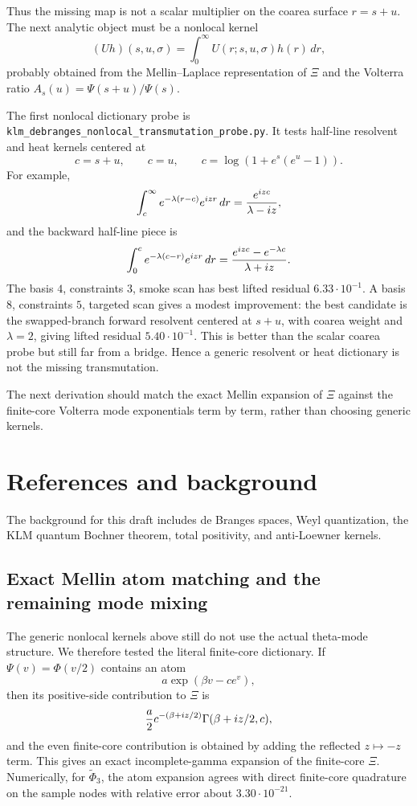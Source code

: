 \documentclass[11pt]{article}
\begin{document}
Thus the missing map is not a scalar multiplier on the coarea surface
\(r=s+u\).  The next analytic object must be a nonlocal kernel
\[
  (Uh)(s,u,\sigma)
  =
  \int_0^\infty U(r;s,u,\sigma)h(r)\,dr,
\]
probably obtained from the Mellin--Laplace representation of \(\Xi\) and the
Volterra ratio \(A_s(u)=\Psi(s+u)/\Psi(s)\).

The first nonlocal dictionary probe is
\texttt{klm\_debranges\_nonlocal\_transmutation\_probe.py}.  It tests
half-line resolvent and heat kernels centered at
\[
  c=s+u,\qquad c=u,\qquad
  c=\log(1+e^s(e^u-1)).
\]
For example,
\[
  \int_c^\infty e^{-\lambda(r-c)}e^{izr}\,dr
  ={e^{izc}\over \lambda-iz},
\]
and the backward half-line piece is
\[
  \int_0^c e^{-\lambda(c-r)}e^{izr}\,dr
  ={e^{izc}-e^{-\lambda c}\over \lambda+iz}.
\]
The basis \(4\), constraints \(3\), smoke scan has best lifted residual
\(6.33\cdot10^{-1}\).  A basis \(8\), constraints \(5\), targeted scan gives a
modest improvement: the best candidate is the swapped-branch forward resolvent
centered at \(s+u\), with coarea weight and \(\lambda=2\), giving lifted
residual \(5.40\cdot10^{-1}\).  This is better than the scalar coarea probe but
still far from a bridge.  Hence a generic resolvent or heat dictionary is not
the missing transmutation.

The next derivation should match the exact Mellin expansion of \(\Xi\) against
the finite-core Volterra mode exponentials term by term, rather than choosing
generic kernels.

\section{References and background}

The background for this draft includes de Branges spaces, Weyl quantization,
the KLM quantum Bochner theorem, total positivity, and anti-Loewner kernels.

\subsection{Exact Mellin atom matching and the remaining mode mixing}

The generic nonlocal kernels above still do not use the actual theta-mode
structure.  We therefore tested the literal finite-core dictionary.  If
\(\Psi(v)=\Phi(v/2)\) contains an atom
\[
  a\exp(\beta v-c e^v),
\]
then its positive-side contribution to \(\Xi\) is
\[
  {a\over 2}c^{-(\beta+iz/2)}
  \Gamma(\beta+iz/2,c),
\]
and the even finite-core contribution is obtained by adding the reflected
\(z\mapsto -z\) term.  This gives an exact incomplete-gamma expansion of the
finite-core \(\Xi\).  Numerically, for \(\widetilde\Phi_3\), the atom expansion
agrees with direct finite-core quadrature on the sample nodes with relative
error about \(3.30\cdot 10^{-21}\).
\end{document}
